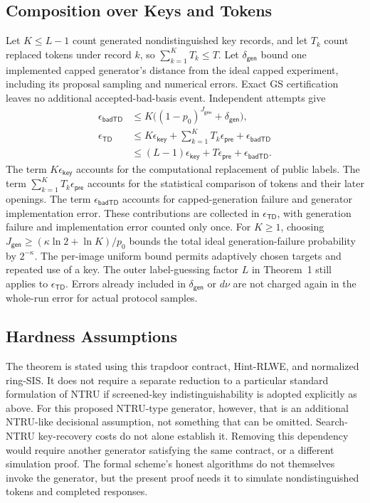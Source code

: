 \documentclass[lettersize,journal]{IEEEtran}
\begin{document}
\subsection{Composition over Keys and Tokens}
Let $K\leq L-1$ count generated nondistinguished key records, and let
$T_k$ count replaced tokens under record $k$, so $\sum_{k=1}^KT_k\leq T$.
Let $\delta_{\mathsf{gen}}$ bound one implemented capped generator's
distance from the ideal capped experiment, including its proposal
sampling and numerical errors. Exact GS certification leaves no
additional accepted-bad-basis event. Independent attempts give
\[
\begin{aligned}
\epsilon_{\mathsf{badTD}}
 &\leq K\bigl((1-p_0)^{J_{\mathsf{gen}}}
                        +\delta_{\mathsf{gen}}\bigr),\\
\epsilon_{\mathsf{TD}}
 &\leq K\epsilon_{\mathsf{key}}
       +\sum_{k=1}^K T_k\epsilon_{\mathsf{pre}}
       +\epsilon_{\mathsf{badTD}}\\
 &\leq (L-1)\epsilon_{\mathsf{key}}
       +T\epsilon_{\mathsf{pre}}+\epsilon_{\mathsf{badTD}}.
\end{aligned}
\]
The term $K\epsilon_{\mathsf{key}}$ accounts for the computational
replacement of public labels.
The term $\sum_{k=1}^{K}T_k\epsilon_{\mathsf{pre}}$ accounts for the
statistical comparison of tokens and their later openings.
The term $\epsilon_{\mathsf{badTD}}$ accounts for capped-generation
failure and generator implementation error.
These contributions are collected in $\epsilon_{\mathsf{TD}}$,
with generation failure and implementation error counted only once. For $K\geq1$, choosing
$J_{\mathsf{gen}}\geq(\kappa\ln2+\ln K)/p_0$ bounds the total ideal
generation-failure probability by $2^{-\kappa}$. The per-image uniform
bound permits adaptively chosen targets and repeated use of a key.
The outer label-guessing factor $L$ in Theorem~1 still applies to
$\epsilon_{\mathsf{TD}}$. Errors already included in
$\delta_{\mathsf{gen}}$ or $d\nu$ are not charged again in the
whole-run error for actual protocol samples.

\subsection{Hardness Assumptions}
The theorem is stated using this trapdoor contract, Hint-RLWE, and
normalized ring-SIS. It does not require a separate reduction to a
particular standard formulation of NTRU if screened-key
indistinguishability is adopted explicitly as above. For this proposed
NTRU-type generator, however, that is an additional NTRU-like
decisional assumption, not something that can be omitted. Search-NTRU
key-recovery costs do not alone establish it. Removing this dependency
would require another generator satisfying the same contract, or a
different simulation proof. The formal scheme's honest algorithms do
not themselves invoke the generator, but the present proof needs it
to simulate nondistinguished tokens and completed responses.
\end{document}

